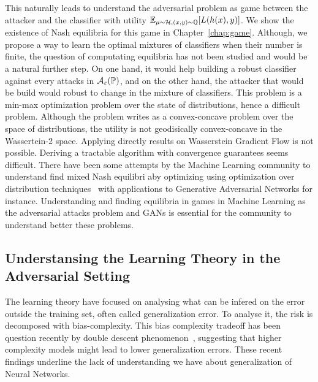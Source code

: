 This naturally leads to understand the adversarial problem as game between the attacker and the classifier with utility $\mathbb{E}_{\mu\sim\mathcal{H},(x,y)\sim\QQ}\left[L(h(x),y)\right]$. We show the existence of Nash equilibria for this game in Chapter~\ref{chap:game}. Although, we propose a way to learn the optimal mixtures of classifiers when their number is finite, the question of  computating equilibria has not been studied and would be a natural further step. On one hand, it would help building a robust classifier against every attacks in $\mathcal{A}_\varepsilon(\mathbb{P})$, and on the other hand, the  attacker that would be build would robust to change in the mixture of classifiers. This problem is a min-max optimization problem over the state of distributions, hence a difficult problem. Although the problem writes as a convex-concave problem over the space of distributions, the utility is not geodisically convex-concave in the Wassertein-2 space. Applying directly results on Wasserstein Gradient Flow is not possible. Deriving a tractable algorithm with convergence guarantees seems difficult. There have been some attempts by the Machine Learning community to understand find mixed Nash equilibri aby optimizing  using optimization over distribution techniques~\citep{hsieh2019finding,domingo2020mean} with applications to Generative Adversarial Networks for instance. Understanding and finding equilibria in games  in Machine Learning as the adversarial attacks problem and GANs is essential for the community to understand better these problems. 





\subsection{Understansing the Learning Theory in the Adversarial Setting}
The learning theory have focused on analysing what can be infered on the error outside the training set, often called generalization error. To analyse it, the risk is decomposed with bias-complexity. This bias complexity tradeoff has been question recently by double descent phenomenon~\citep{belkin2018overfitting,belkin2019reconciling}, suggesting that higher complexity models might lead to lower generalization errors. These recent findings underline the lack of understanding we have about generalization of Neural Networks.

